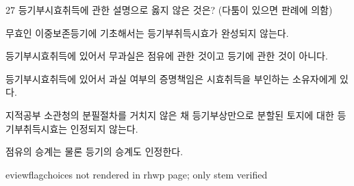 \begin{question}{27}
등기부시효취득에 관한 설명으로 옳지 않은 것은? (다툼이 있으면 판례에 의함)
\begin{choices}
  \item 무효인 이중보존등기에 기초해서는 등기부취득시효가 완성되지 않는다.
  \item 등기부시효취득에 있어서 무과실은 점유에 관한 것이고 등기에 관한 것이 아니다.
  \item 등기부시효취득에 있어서 과실 여부의 증명책임은 시효취득을 부인하는 소유자에게 있다.
  \item 지적공부 소관청의 분필절차를 거치지 않은 채 등기부상만으로 분할된 토지에 대한 등기부취득시효는 인정되지 않는다.
  \item 점유의 승계는 물론 등기의 승계도 인정한다.
\end{choices}

eviewflag{choices not rendered in rhwp page; only stem verified}
\end{question}
